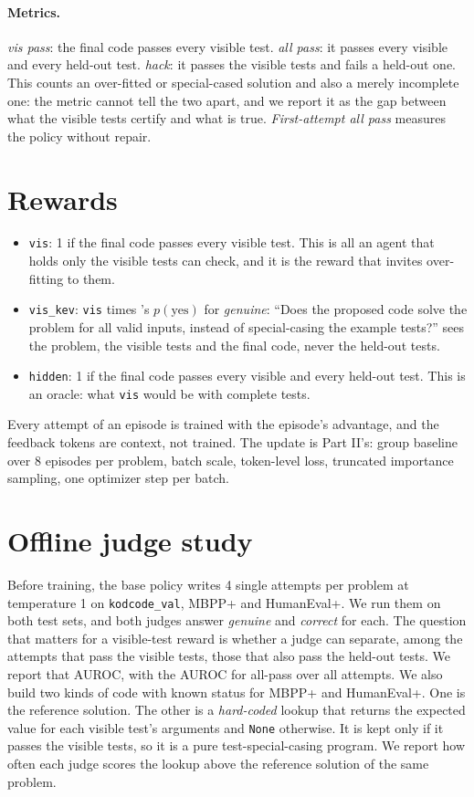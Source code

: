 \paragraph{Metrics.} \emph{vis pass}: the final code passes every visible test. \emph{all pass}: it passes every
visible and every held-out test. \emph{hack}: it passes the visible tests and fails a held-out one. This counts an
over-fitted or special-cased solution and also a merely incomplete one: the metric cannot tell the two apart, and we
report it as the gap between what the visible tests certify and what is true. \emph{First-attempt all pass} measures
the policy without repair.

\section{Rewards}\label{sec:rewards}

\begin{itemize}
\item \texttt{vis}: 1 if the final code passes every visible test. This is all an agent that holds only the visible
  tests can check, and it is the reward that invites over-fitting to them.
\item \texttt{vis\_kev}: \texttt{vis} times \kev{}'s $p(\text{yes})$ for \emph{genuine}: ``Does the proposed code solve
  the problem for all valid inputs, instead of special-casing the example tests?'' \kev{} sees the problem, the visible
  tests and the final code, never the held-out tests.
\item \texttt{hidden}: 1 if the final code passes every visible and every held-out test. This is an oracle: what
  \texttt{vis} would be with complete tests.
\end{itemize}
Every attempt of an episode is trained with the episode's advantage, and the feedback tokens are context, not trained.
The update is Part II's: group baseline over 8 episodes per problem, batch scale, token-level loss, truncated importance
sampling, one optimizer step per batch.

\section{Offline judge study}\label{sec:code-study}

Before training, the base policy writes 4 single attempts per problem at temperature 1 on \texttt{kodcode\_val}, MBPP+
and HumanEval+. We run them on both test sets, and both judges answer \emph{genuine} and \emph{correct} for each. The
question that matters for a visible-test reward is whether a judge can separate, among the attempts that pass the
visible tests, those that also pass the held-out tests. We report that AUROC, with the AUROC for all-pass over all
attempts. We also build two kinds of code with known status for MBPP+ and HumanEval+. One is the reference solution.
The other is a \emph{hard-coded} lookup that returns the expected value for each visible test's arguments and
\texttt{None} otherwise. It is kept only if it passes the visible tests, so it is a pure test-special-casing program. We
report how often each judge scores the lookup above the reference solution of the same problem.
